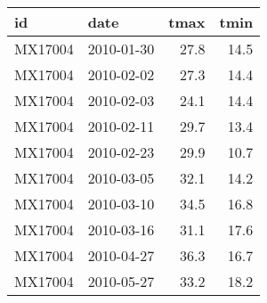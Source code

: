 \begin{tabular}{llrr}
  \toprule
 id & date & tmax & tmin \\ 
  \midrule
  MX17004 & 2010-01-30 & 27.8 & 14.5 \\ 
  MX17004 & 2010-02-02 & 27.3 & 14.4 \\ 
  MX17004 & 2010-02-03 & 24.1 & 14.4 \\ 
  MX17004 & 2010-02-11 & 29.7 & 13.4 \\ 
  MX17004 & 2010-02-23 & 29.9 & 10.7 \\ 
  MX17004 & 2010-03-05 & 32.1 & 14.2 \\ 
  MX17004 & 2010-03-10 & 34.5 & 16.8 \\ 
  MX17004 & 2010-03-16 & 31.1 & 17.6 \\ 
  MX17004 & 2010-04-27 & 36.3 & 16.7 \\ 
  MX17004 & 2010-05-27 & 33.2 & 18.2 \\ 
   \bottomrule
\end{tabular}
